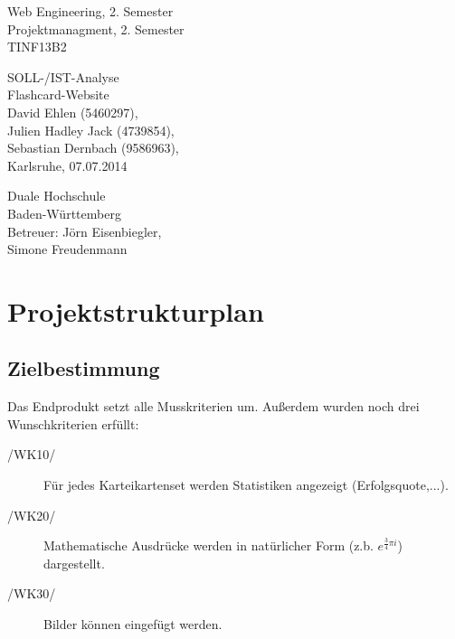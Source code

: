 \documentclass{article}
\newcommand{\appname}{Flashcard-Website}
\begin{document}
\begin{titlepage}
    \large
    \begin{flushleft}
        Web Engineering, 2. Semester \\
        Projektmanagment, 2. Semester \\
        TINF13B2
    \end{flushleft}
    
    \vfill

    \begin{center}
        \Huge SOLL-/IST-Analyse\\
        \Large \appname \\
        \vspace{1cm}
        \normalsize David Ehlen (5460297),\\
        Julien Hadley Jack (4739854), \\
        Sebastian Dernbach (9586963), \\
        \vspace\medskipamount
        \vspace\medskipamount
        Karlsruhe, 07.07.2014
    \end{center}
    
    \vfill
    
    \begin{flushright}
        Duale Hochschule \\
        Baden-Württemberg \\
        \vspace\medskipamount
        Betreuer: Jörn Eisenbiegler,\\
        Simone Freudenmann
    \end{flushright}
\end{titlepage}

\newpage

\pagestyle{empty}
\tableofcontents
\cleardoublepage

\setcounter{page}{1}
\pagestyle{plain}
\setcounter{page}{1}

\section{Projektstrukturplan}
\subsection{Zielbestimmung}
Das Endprodukt setzt alle Musskriterien um. Außerdem wurden noch drei Wunschkriterien erfüllt:
\begin{description}
	\item[/WK10/] Für jedes Karteikartenset werden Statistiken angezeigt (Erfolgsquote,...).
	\item[/WK20/] Mathematische Ausdrücke werden in natürlicher Form (z.b. \( e^{\frac{3}{4}\pi i}\)) dargestellt.
	\item[/WK30/]\label{bilder} Bilder können eingefügt werden.
\end{description}
\end{document}
